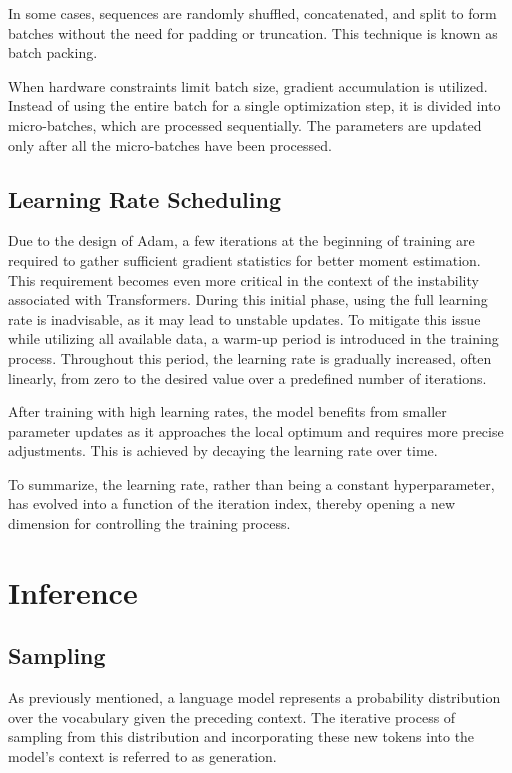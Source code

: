 In some cases, sequences are randomly shuffled, concatenated, and split to form batches without the need for padding or truncation. This technique is known as batch packing.

When hardware constraints limit batch size, gradient accumulation is utilized. Instead of using the entire batch for a single optimization step, it is divided into micro-batches, which are processed sequentially. The parameters are updated only after all the micro-batches have been processed.

\subsection{Learning Rate Scheduling}

Due to the design of Adam, a few iterations at the beginning of training are required to gather sufficient gradient statistics for better moment estimation. This requirement becomes even more critical in the context of the instability associated with Transformers. During this initial phase, using the full learning rate is inadvisable, as it may lead to unstable updates. To mitigate this issue while utilizing all available data, a warm-up period is introduced in the training process. Throughout this period, the learning rate is gradually increased, often linearly, from zero to the desired value over a predefined number of iterations.

After training with high learning rates, the model benefits from smaller parameter updates as it approaches the local optimum and requires more precise adjustments. This is achieved by decaying the learning rate over time.

To summarize, the learning rate, rather than being a constant hyperparameter, has evolved into a function of the iteration index, thereby opening a new dimension for controlling the training process.

\section{Inference}\label{sec:inference}


\subsection{Sampling}\label{sec:sampling}

As previously mentioned, a language model represents a probability distribution over the vocabulary given the preceding context. The iterative process of sampling from this distribution and incorporating these new tokens into the model's context is referred to as generation.


